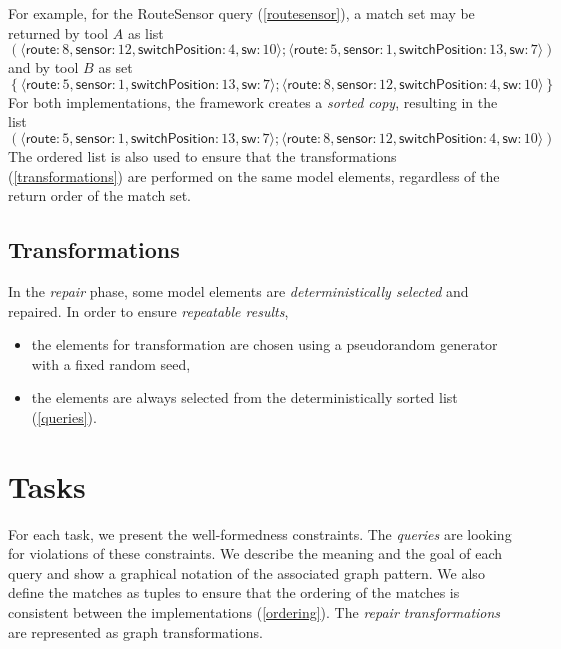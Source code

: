 \documentclass[submission,copyright,creativecommons]{eptcs}
\begin{document}
  
For example, for the \textsf{RouteSensor} query (\autoref{routesensor}), a match set may be returned by tool $A$ as list
\[\left(
\langle\textsf{route}: 8, \textsf{sensor}: 12, \textsf{switchPosition}: 4, \textsf{sw}: 10\rangle;
\langle\textsf{route}: 5, \textsf{sensor}: 1, \textsf{switchPosition}: 13, \textsf{sw}: 7\rangle
\right)\]
and by tool $B$ as set
\[\left\{
\langle\textsf{route}: 5, \textsf{sensor}: 1, \textsf{switchPosition}: 13, \textsf{sw}: 7\rangle;
\langle\textsf{route}: 8, \textsf{sensor}: 12, \textsf{switchPosition}: 4, \textsf{sw}: 10\rangle
\right\}\]
For both implementations, the framework creates a \emph{sorted copy}, resulting in the list
\[\left(
\langle\textsf{route}: 5, \textsf{sensor}: 1, \textsf{switchPosition}: 13, \textsf{sw}: 7\rangle;
\langle\textsf{route}: 8, \textsf{sensor}: 12, \textsf{switchPosition}: 4, \textsf{sw}: 10\rangle
\right)\]
The ordered list is also used to ensure that the transformations (\autoref{transformations}) are performed on the same model elements, regardless of the return order of the match set.

\subsection{Transformations}
\label{transformations}

In the \emph{repair} phase, some model elements are \emph{deterministically selected} and repaired. In order to ensure \emph{repeatable results},

\begin{itemize}
  \item the elements for transformation are chosen using a pseudorandom generator with a fixed random seed,
  \item the elements are always selected from the deterministically sorted list (\autoref{queries}).
\end{itemize}

\section{Tasks}
\label{tasks}

For each task, we present the well-formedness constraints. The \emph{queries} are looking for violations of these constraints. We describe the meaning and the goal of each query and show a graphical notation of the associated graph pattern. We also define the matches as tuples to ensure that the ordering of the matches is consistent between the implementations (\autoref{ordering}). The \emph{repair transformations} are represented as graph transformations.
\end{document}
